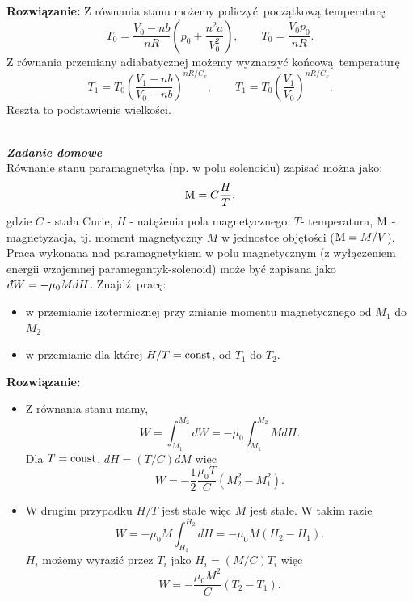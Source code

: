 \documentclass[11pt,a4paper]{article}
\newcounter{zaddom}\newcommand{\zaddom}[1][]{\addtocounter{zaddom}{1} ~\\  {\bf \emph{Zadanie domowe \arabic{zaddom} #1 }} \\}
\newcommand{\dbar}{{\mkern3mu\mathchar'26\mkern-12mu d}}
\begin{document}
\vskip 10pt
\textbf{Rozwiązanie:}
Z równania stanu możemy policzyć początkową temperaturę
\begin{equation}
	T_0 = \frac{V_0-nb}{nR}\left(p_0 + \frac{n^2 a}{V_0^2} \right), \qquad T_0 = \frac{V_0 p_0}{nR}.
\end{equation}
Z równania przemiany adiabatycznej możemy wyznaczyć końcową temperaturę
\begin{equation}
	T_1 = T_0 \left(\frac{V_1 - nb}{V_0 - nb} \right)^{nR/C_v}, \qquad T_1 = T_0 \left(\frac{V_1}{V_0} \right)^{nR/C_v}.
\end{equation}
Reszta to podstawienie wielkości.

\zaddom
Równanie stanu paramagnetyka (np. w polu solenoidu) zapisać można jako:
\[  {\rm M}= C \frac{H}{T}, \]
gdzie $C$ - stała Curie, $H$ - natężenia pola magnetycznego, $T$- temperatura,
$\rm M$ - magnetyzacja, tj. moment magnetyczny $M$ w jednostce objętości (${\rm M}=M/V$).
Praca wykonana nad paramagnetykiem w polu magnetycznym
 (z wyłączeniem energii wzajemnej paramegantyk-solenoid) może być zapisana jako
 $\dbar W = -\mu_0 M dH$.
Znajdź pracę: 
\begin{itemize}
\item w przemianie izotermicznej przy zmianie momentu magnetycznego od $M_1$ do $M_2$
\item w przemianie dla której $H/T={\rm const}$, od $T_1$ do $T_2$. 
\end{itemize}

\vskip 10pt
\textbf{Rozwiązanie:}

\begin{itemize}
\item Z równania stanu mamy, 
\begin{equation}
	W = \int_{M_1}^{M_2} dW = - \mu_0 \int_{M_1}^{M_2} M dH.
\end{equation}	
Dla $T={\rm const}$, $dH = (T/C) dM$ więc 
\begin{equation}
	W = - \frac{1}{2} \frac{\mu_0 T}{C} \left(M_2^2 - M_1^2 \right).
\end{equation} 
\item W drugim przypadku $H/T$ jest stałe więc $M$ jest stałe. W takim razie 
\begin{equation}
	W = - \mu_0 M \int_{H_1}^{H_2} dH = - \mu_0 M (H_2 - H_1).
\end{equation}
$H_i$ możemy wyrazić przez $T_i$ jako $H_i = (M/C) T_i$ więc 
\begin{equation}
	W = - \frac{\mu_0 M^2}{C} (T_2 - T_1).
\end{equation}

\end{itemize}
\end{document}
